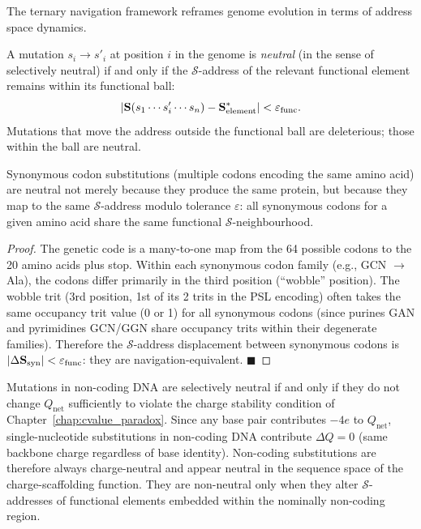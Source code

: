 The ternary navigation framework reframes genome evolution in terms of
address space dynamics.

\begin{definition}
\label{def:neutral_mutation}
A mutation $s_i \to s'_i$ at position $i$ in the genome is \emph{neutral}
(in the sense of selectively neutral) if and only if the $\mathcal{S}$-address
of the relevant functional element remains within its functional ball:
\begin{equation}
  |\mathbf{S}(s_1\cdots s'_i\cdots s_n) - \mathbf{S}^*_{\mathrm{element}}|
    < \varepsilon_{\mathrm{func}}.
  \label{eq:neutral_mutation}
\end{equation}
Mutations that move the address outside the functional ball are deleterious;
those within the ball are neutral.
\end{definition}

\begin{proposition}
\label{prop:synonymous}
Synonymous codon substitutions (multiple codons encoding the same amino
acid) are neutral not merely because they produce the same protein, but
because they map to the same $\mathcal{S}$-address modulo tolerance $\varepsilon$:
all synonymous codons for a given amino acid share the same functional
$\mathcal{S}$-neighbourhood.
\end{proposition}

\begin{proof}
The genetic code is a many-to-one map from the 64 possible codons to
the 20 amino acids plus stop. Within each synonymous codon family (e.g.,
GCN $\to$ Ala), the codons differ primarily in the third position
(``wobble'' position). The wobble trit (3rd position, 1st of its 2 trits
in the PSL encoding) often takes the same occupancy trit value (0 or 1)
for all synonymous codons (since purines GAN and pyrimidines GCN/GGN
share occupancy trits within their degenerate families). Therefore the
$\mathcal{S}$-address displacement between synonymous codons is
$|\Delta\mathbf{S}_{\mathrm{syn}}| < \varepsilon_{\mathrm{func}}$: they
are navigation-equivalent. $\blacksquare$
\end{proof}

\begin{proposition}
\label{prop:noncoding_neutral}
Mutations in non-coding DNA are selectively neutral if and only if they
do not change $Q_{\mathrm{net}}$ sufficiently to violate the charge
stability condition of Chapter~\ref{chap:cvalue_paradox}. Since any
base pair contributes $-4e$ to $Q_{\mathrm{net}}$, single-nucleotide
substitutions in non-coding DNA contribute $\Delta Q = 0$ (same
backbone charge regardless of base identity). Non-coding substitutions
are therefore always charge-neutral and appear neutral in the sequence
space of the charge-scaffolding function. They are non-neutral only
when they alter $\mathcal{S}$-addresses of functional elements
embedded within the nominally non-coding region.
\end{proposition}

